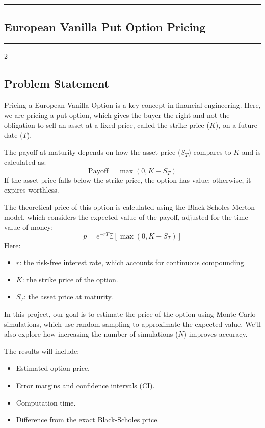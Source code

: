 

{\color{gray}\hrule}
\begin{center}
\section{European Vanilla Put Option Pricing}
\bigskip
\end{center}
{\color{gray}\hrule}
\begin{multicols}{2}

\subsection{Problem Statement}
Pricing a European Vanilla Option is a key concept in financial engineering. Here, we are pricing a put option, which gives the buyer the right and not the obligation to sell an asset at a fixed price, called the strike price (\(K\)), on a future date (\(T\)). 

The payoff at maturity depends on how the asset price (\(S_T\)) compares to \(K\) and is calculated as:
\[\text{Payoff} = \max(0, K - S_T)
\]
If the asset price falls below the strike price, the option has value; otherwise, it expires worthless. 

The theoretical price of this option is calculated using the Black-Scholes-Merton model, which considers the expected value of the payoff, adjusted for the time value of money:
$$
    p = e^{-rT} \mathbb{E}[\max(0, K - S_T)]
$$
Here:
\begin{itemize}
    \item \(r\): the risk-free interest rate, which accounts for continuous compounding.
    \item \(K\): the strike price of the option.
    \item \(S_T\): the asset price at maturity.
\end{itemize}

In this project, our goal is to estimate the price of the option using Monte Carlo simulations, which use random sampling to approximate the expected value. We'll also explore how increasing the number of simulations (\(N\)) improves accuracy. 

The results will include:
\begin{itemize}
    \item Estimated option price.
    \item Error margins and confidence intervals (CI).
    \item Computation time.
    \item Difference from the exact Black-Scholes price.
\end{itemize}


\end{multicols}
